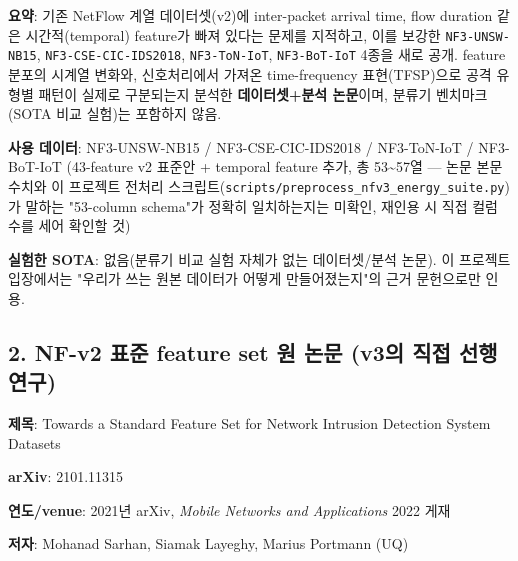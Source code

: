 \par\noindent \textbullet\enspace \textbf{요약}: 기존 NetFlow 계열 데이터셋(v2)에 inter-packet arrival time, flow duration 같은 시간적(temporal) feature가 빠져 있다는 문제를 지적하고, 이를 보강한 \texttt{NF3-\allowbreak{}UNSW\allowbreak{}-\allowbreak{}NB15}, \texttt{NF3-\allowbreak{}CSE-\allowbreak{}CIC-\allowbreak{}IDS2\allowbreak{}018}, \texttt{NF3-\allowbreak{}ToN-\allowbreak{}IoT}, \texttt{NF3-\allowbreak{}BoT-\allowbreak{}IoT} 4종을 새로 공개. feature 분포의 시계열 변화와, 신호처리에서 가져온 time-frequency 표현(TFSP)으로 공격 유형별 패턴이 실제로 구분되는지 분석한 \textbf{데이터셋+\allowbreak{}분석 논문}이며, 분류기 벤치마크(SOTA 비교 실험)는 포함하지 않음.


\par\noindent \textbullet\enspace \textbf{사용 데이터}: NF3-UNSW-NB15 /\allowbreak{} NF3-CSE-CIC-IDS2018 /\allowbreak{} NF3-ToN-IoT /\allowbreak{} NF3-BoT-IoT (43-feature v2 표준안 +\allowbreak{} temporal feature 추가, 총 53\textasciitilde{}57열 — 논문 본문 수치와 이 프로젝트 전처리 스크립트(\texttt{scripts/\allowbreak{}\allowbreak{}preproce\allowbreak{}ss\_\allowbreak{}\allowbreak{}nfv3\_\allowbreak{}\allowbreak{}energy\_\allowbreak{}\allowbreak{}s\allowbreak{}uite.\allowbreak{}py})가 말하는 "53-column schema"가 정확히 일치하는지는 미확인, 재인용 시 직접 컬럼 수를 세어 확인할 것)


\par\noindent \textbullet\enspace \textbf{실험한 SOTA}: 없음(분류기 비교 실험 자체가 없는 데이터셋/\allowbreak{}분석 논문). 이 프로젝트 입장에서는 "우리가 쓰는 원본 데이터가 어떻게 만들어졌는지"의 근거 문헌으로만 인용.


\subsection{2. NF-v2 표준 feature set 원 논문 (v3의 직접 선행 연구)}
\par\noindent \textbullet\enspace \textbf{제목}: Towards a Standard Feature Set for Network Intrusion Detection System Datasets


\par\noindent \textbullet\enspace \textbf{arXiv}: 2101.11315


\par\noindent \textbullet\enspace \textbf{연도/\allowbreak{}venue}: 2021년 arXiv, \emph{Mobile Networks and Applications} 2022 게재


\par\noindent \textbullet\enspace \textbf{저자}: Mohanad Sarhan, Siamak Layeghy, Marius Portmann (UQ)


